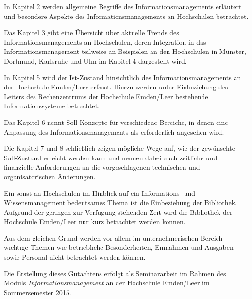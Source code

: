 In Kapitel 2 werden allgemeine Begriffe des Informationsmanagements erläutert und
besondere Aspekte des Informationsmanagements an Hochschulen betrachtet.

Das Kapitel 3 gibt eine Übersicht über aktuelle Trends des Informationsmanagements an Hochschulen, deren 
Integration in das Informationsmanagement teilweise an Beispielen an den Hochschulen in Münster, Dortmund, 
Karlsruhe und Ulm im Kapitel 4 dargestellt wird.

In Kapitel 5 wird der Ist-Zustand hinsichtlich des Informationsmanagements an der Hochschule Emden/Leer erfasst. Hierzu werden unter Einbeziehung des Leiters des Rechenzentrums der Hochschule Emden/Leer bestehende Informationssysteme betrachtet.

Das Kapitel 6 nennt Soll-Konzepte für verschiedene Bereiche, in denen eine Anpassung des 
Informationsmanagements als erforderlich angesehen wird.

Die Kapitel 7 und 8 schließlich zeigen mögliche Wege auf, wie der gewünschte Soll-Zustand erreicht werden kann
und nennen dabei auch zeitliche und finanzielle Anforderungen an die vorgeschlagenen technischen und 
organisatorischen Änderungen.

Ein sonst an Hochschulen im Hinblick auf ein Informations- und Wissensmanagement bedeutsames Thema ist die Einbeziehung der Bibliothek. Aufgrund der geringen zur Verfügung stehenden Zeit wird die Bibliothek der Hochschule Emden/Leer nur kurz betrachtet werden können.

Aus dem gleichen Grund werden vor allem im unternehmerischen Bereich wichtige Themen wie betriebliche Besonderheiten, Einnahmen und Ausgaben sowie Personal nicht betrachtet werden können.

Die Erstellung dieses Gutachtens erfolgt als Seminararbeit im Rahmen des Moduls \textit{Informationsmanagement} an der Hochschule Emden/Leer im Sommersemester 2015. 